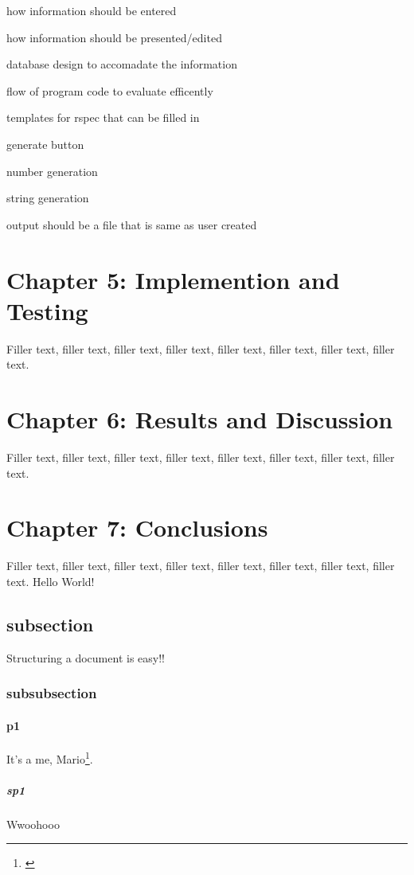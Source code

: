 \documentclass{article}
\begin{document}
\par how information should be entered

\par how information should be presented/edited

\par database design to accomadate the information

\par flow of program code to evaluate efficently

\par templates for rspec that can be filled in

\par generate button

\par number generation

\par string generation

\par output should be a file that is same as user created






\section{Chapter 5: Implemention and Testing}
Filler text, filler text, filler text, filler text, filler text, filler text, filler text, filler text.
\section{Chapter 6: Results and Discussion}
Filler text, filler text, filler text, filler text, filler text, filler text, filler text, filler text.
\section{Chapter 7: Conclusions}
Filler text, filler text, filler text, filler text, filler text, filler text, filler text, filler text.
Hello World!
\subsection{subsection}
Structuring a document is easy!! \cite{near2012rubicon}
\subsubsection{subsubsection}
\paragraph{p1}
It's a me, Mario\footnote{\label{myfootnote}\cite{near2012rubicon}}.
\subparagraph{sp1}
Wwoohooo
\end{document}
